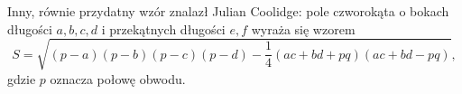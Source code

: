 Inny, równie przydatny wzór znalazł Julian Coolidge:
%
pole czworokąta o bokach długości $a, b, c, d$ i przekątnych długości $e, f$ wyraża się wzorem
\begin{equation}
    S = \sqrt{(p-a)(p-b)(p-c)(p-d) - \frac 1 4 (ac + bd + pq)(ac + bd - pq)},
\end{equation}
gdzie $p$ oznacza połowę obwodu.


%